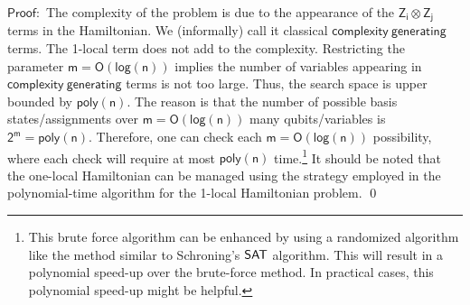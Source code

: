 \documentclass[11pt]{article}
\begin{document}
$\mathsf{Proof:}$ The complexity of the problem is due to the appearance of the $\mathsf{Z_i\otimes Z_j}$ terms in the Hamiltonian. We (informally) call it classical $\mathsf{complexity\ generating}$ terms. The 1-local term does not add to the complexity. Restricting the parameter $\mathsf{m=O(log(n))}$ implies the number of variables appearing in $\mathsf{complexity\ generating}$ terms is not too large. Thus, the search space is upper bounded by $\mathsf{poly(n)}$. The reason is that the number of possible basis states/assignments over $\mathsf{m=O(log(n))}$ many qubits/variables is $\mathsf{2^{m} = poly(n)}$. Therefore, one can check each $\mathsf{m=O(log(n))}$ possibility, where each check will require at most $\mathsf{poly(n)}$ time.\footnote{This brute force algorithm can be enhanced by using a randomized algorithm like the method similar to Schroning's $\mathsf{SAT}$ algorithm. This will result in a polynomial speed-up over the brute-force method. In practical cases, this polynomial speed-up might be helpful.} It should be noted that the one-local Hamiltonian can be managed using the strategy employed in the polynomial-time algorithm for the 1-local Hamiltonian problem.  \qed 
\end{document}
